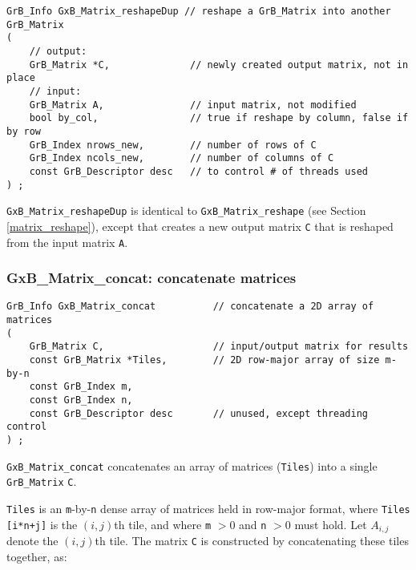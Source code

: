 \documentclass[12pt]{article}
\begin{document}
\begin{mdframed}[userdefinedwidth=6in]
{\footnotesize
\begin{verbatim}
GrB_Info GxB_Matrix_reshapeDup // reshape a GrB_Matrix into another GrB_Matrix
(
    // output:
    GrB_Matrix *C,              // newly created output matrix, not in place
    // input:
    GrB_Matrix A,               // input matrix, not modified
    bool by_col,                // true if reshape by column, false if by row
    GrB_Index nrows_new,        // number of rows of C
    GrB_Index ncols_new,        // number of columns of C
    const GrB_Descriptor desc   // to control # of threads used
) ;
\end{verbatim} } \end{mdframed}

\verb'GxB_Matrix_reshapeDup' is identical to \verb'GxB_Matrix_reshape' (see
Section \ref{matrix_reshape}), except that creates a new output matrix
\verb'C' that is reshaped from the input matrix \verb'A'.

\subsubsection{{\sf GxB\_Matrix\_concat:} concatenate matrices   }
\label{matrix_concat}

\begin{mdframed}[userdefinedwidth=6in]
{\footnotesize
\begin{verbatim}
GrB_Info GxB_Matrix_concat          // concatenate a 2D array of matrices
(
    GrB_Matrix C,                   // input/output matrix for results
    const GrB_Matrix *Tiles,        // 2D row-major array of size m-by-n
    const GrB_Index m,
    const GrB_Index n,
    const GrB_Descriptor desc       // unused, except threading control
) ;
\end{verbatim} } \end{mdframed}

\verb'GxB_Matrix_concat' concatenates an array of matrices (\verb'Tiles') into
a single \verb'GrB_Matrix' \verb'C'.

\verb'Tiles' is an \verb'm'-by-\verb'n' dense array of matrices held in
row-major format, where \verb'Tiles [i*n+j]' is the $(i,j)$th tile, and where
\verb'm' $> 0$ and \verb'n' $> 0$ must hold.  Let $A_{i,j}$ denote the
$(i,j)$th tile.  The matrix \verb'C' is constructed by concatenating these
tiles together, as:
\end{document}
